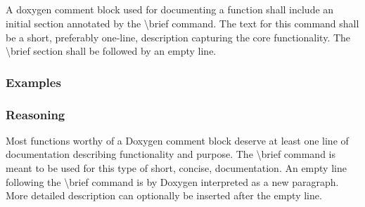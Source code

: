 \subsection*{\doxygenRule{}}

A doxygen comment block used for documenting a function shall include an initial section annotated by the \textbackslash brief command. The text for this command shall be a short, preferably one-line, description capturing the core functionality. The \textbackslash brief section shall be followed by an empty line.

\subsubsection*{Examples}

\noindent
\begin{minipage}[t]{0.47\textwidth}
    
\end{minipage}\hfill
\begin{minipage}[t]{0.47\textwidth}
    
\end{minipage}

\subsubsection*{Reasoning}

 Most functions worthy of a Doxygen comment block deserve at least one line of documentation describing functionality and purpose. The \textbackslash brief command is meant to be used for this type of short, concise, documentation. An empty line following the \textbackslash brief command is by Doxygen interpreted as a new paragraph. More detailed description can optionally be inserted after the empty line.
